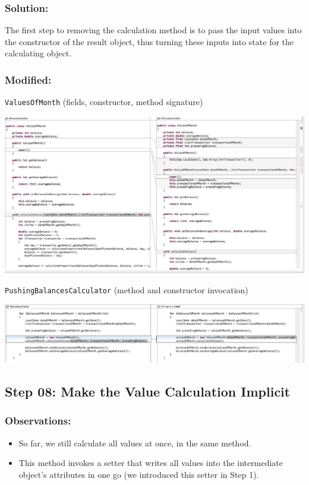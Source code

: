 \documentclass[a4paper,fleqn,titlepage,11pt]{article}
\begin{document}
\subsubsection*{Solution:}

The first step to removing the calculation method is to pass the input values into the constructor of the result object, thus turning these inputs into state for the calculating object.

\subsubsection*{Modified:}

\texttt{ValuesOfMonth} (fields, constructor, method signature)

\includegraphics[width=1\textwidth]{CompareViews/06-07-2.jpg}

\texttt{PushingBalancesCalculator} (method and constructor invocation)

\includegraphics[width=1\textwidth]{CompareViews/06-07-1.jpg}




\subsection*{Step 08: Make the Value Calculation Implicit}

\subsubsection*{Observations:}
\begin{itemize}
\item So far, we still calculate all values at once, in the same method. 
\item This method invokes a setter that writes all values into the intermediate object's attributes in one go (we introduced this setter in Step 1).
\end{itemize}
\end{document}
